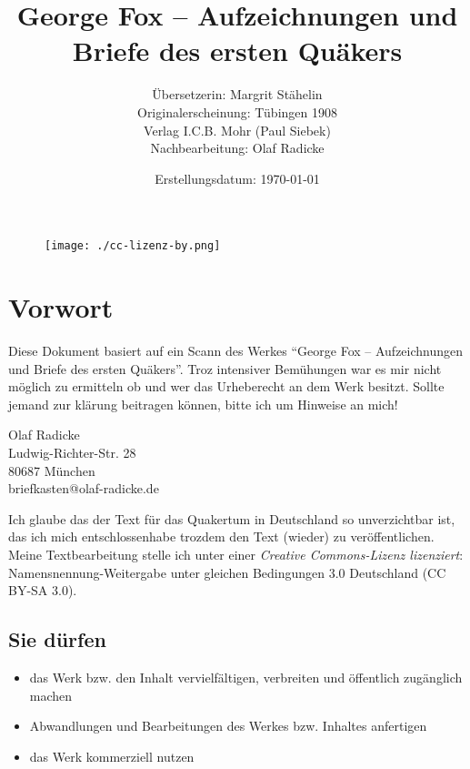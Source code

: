 \documentclass[a5paper,10pt]{article}
\title{George Fox -- Aufzeichnungen und Briefe des ersten Quäkers}
\author{Übersetzerin: Margrit Stähelin \\ 
Originalerscheinung: Tübingen 1908 \\ 
Verlag I.C.B. Mohr (Paul Siebek) \\
Nachbearbeitung: Olaf Radicke
}
\date{Erstellungsdatum: \today}
\begin{document}
\maketitle

\begin{figure}[h!]
 \centering
 \texttt{[image: ./cc-lizenz-by.png]}
\end{figure}

\newpage 

\tableofcontents

\newpage 

\section{Vorwort}
\label{sec:vorwort}

Diese Dokument basiert auf ein Scann des Werkes ``George Fox -- 
Aufzeichnungen und Briefe des ersten Quäkers''. Troz intensiver Bemühungen war es mir nicht
möglich zu ermitteln ob und wer das Urheberecht an dem Werk besitzt. Sollte jemand zur
klärung beitragen können, bitte ich um Hinweise an mich!

\begin{center}
Olaf Radicke \\
Ludwig-Richter-Str. 28 \\
80687 München \\
briefkasten@olaf-radicke.de \\
\end{center}

Ich glaube das der Text für das Quakertum in Deutschland so unverzichtbar ist,
das ich mich entschlossenhabe trozdem den Text (wieder) zu veröffentlichen. Meine 
Textbearbeitung stelle ich unter einer \textit{Creative Commons-Lizenz lizenziert}: 
Namensnennung-Weitergabe unter gleichen Bedingungen 3.0 Deutschland (CC BY-SA 3.0).

\subsection{Sie dürfen}

\begin{itemize}
 \item das Werk bzw. den Inhalt vervielfältigen, verbreiten und öffentlich zugänglich machen
 \item Abwandlungen und Bearbeitungen des Werkes bzw. Inhaltes anfertigen
 \item das Werk kommerziell nutzen
\end{itemize}
\end{document}
